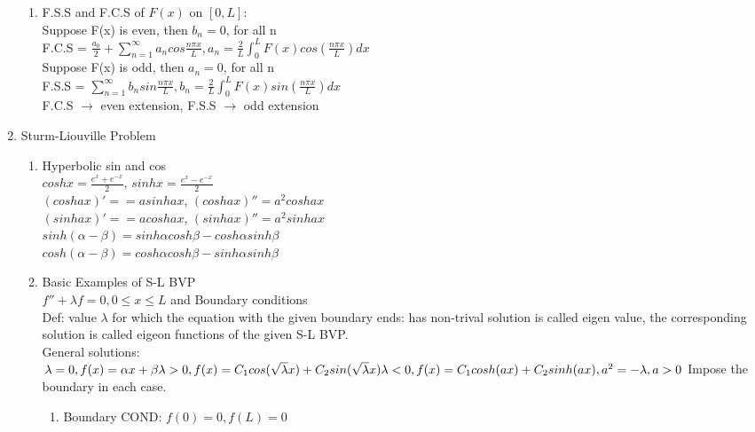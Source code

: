 \documentclass[10pt]{article}
\begin{document}
\begin{multicols}{2}
\begin{enumerate}
\begin{enumerate}
		\item F.S.S and F.C.S of $F(x)$ on $[0,L]$:\\
		Suppose F(x) is even, then $b_n = 0$, for all n\\
		F.C.S = $\frac{a_0}{2} + \sum_{n=1}^{\infty}a_ncos\frac{n\pi x}{L},
		a_n = \frac{2}{L}\int_{0}^{L}F(x)cos(\frac{n\pi x}{L})dx$\\
		Suppose F(x) is odd, then $a_n = 0$, for all n\\
		F.S.S = $\sum_{n=1}^{\infty}b_nsin\frac{n\pi x}{L},
		b_n = \frac{2}{L}\int_{0}^{L}F(x)sin(\frac{n\pi x}{L})dx$\\
		F.C.S $\rightarrow$ even extension, F.S.S $\rightarrow$ odd extension\\
	\end{enumerate}

	\item Sturm-Liouville Problem
		\begin{enumerate}
			\item Hyperbolic sin and cos\\
		    $coshx = \frac{e^x + e^{-x}}{2}$, $sinhx = \frac{e^x - e^{-x}}{2}$\\
		    $(coshax)' = =asinhax$, $(coshax)'' = a^2coshax$\\
		    $(sinhax)' = =acoshax$, $(sinhax)'' = a^2sinhax$\\
		    $sinh(\alpha - \beta) = sinh\alpha cosh\beta - cosh\alpha sinh\beta$\\
		    $cosh(\alpha - \beta) = cosh\alpha cosh\beta - sinh\alpha sinh\beta$
			\item Basic Examples of S-L BVP\\
			$f'' + \lambda f = 0, 0\le x \le L$ and Boundary conditions\\
			Def: value $\lambda$ for which the equation with the given boundary ends: has non-trival solution is called eigen value, the corresponding solution is called eigeon functions of the given S-L BVP.\\
			General solutions:\\
			$\lambda = 0, f(x) = \alpha x + \beta\\
			\lambda > 0, f(x) = C_1 cos(\sqrt{\lambda}x) + C_2 sin(\sqrt{\lambda}x)\\
			\lambda < 0, f(x) = C_1 cosh(ax) + C_2 sinh(ax), a^2 = -\lambda, a > 0$
			Impose the boundary in each case.
			\begin{enumerate}
				\item Boundary COND: $f(0) = 0, f(L) = 0$\\

\end{enumerate}
\end{enumerate}
\end{enumerate}
\end{multicols}
\end{document}
